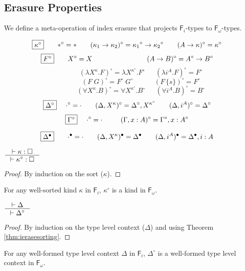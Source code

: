 \documentclass{llncs}
\newcommand{\Fi}{\ensuremath{\mathsf{F}_i}}
\newcommand{\Fw}{\ensuremath{\mathsf{F}_\omega}}
\begin{document}
\subsection{Erasure Properties} \label{ssec:erasure}

We define a meta-operation of index erasure that projects $\Fi$-types
to $\Fw$-types.

\begin{definition}\label{def:ierase}
\[ \fbox{$\kappa^\circ$}
 ~~~~ ~~
 *^\circ =
 *
 ~~~~ ~~
 (\kappa_1 -> \kappa_2)^\circ =
 {\kappa_1}^\circ -> {\kappa_2}^\circ
 ~~~~ ~~
 (A -> \kappa)^\circ =
 \kappa^\circ
\]
\[ \fbox{$F^\circ$}
 ~~~~ ~~
 X^\circ =
 X
 ~~~~ ~~~~ ~~~~ ~~~~ ~~~~ ~~~~
 (A -> B)^\circ =
 A^\circ -> B^\circ
\]
\[ \qquad \qquad
 (\lambda X^\kappa.F)^\circ =
 \lambda X^{\kappa^\circ}.F^\circ
 ~~~~ ~~~
 (\lambda i^A.F)^\circ =
 F^\circ
\]
\[ \qquad \qquad
 (F\;G)^\circ =
 F^\circ\;G^\circ
 ~~~~ ~~~~ ~~~~ ~~
 (F\,\{s\})^\circ =
 F^\circ
\]
\[ \qquad \qquad
 (\forall X^\kappa . B)^\circ =
 \forall X^{\kappa^\circ} . B^\circ
 ~~~~ ~~~
 (\forall i^A . B)^\circ =
 B^\circ
\]
\[ \fbox{$\Delta^\circ$}
 ~~~~
 \cdot^\circ = \cdot
 ~~~~ ~~
 (\Delta,X^\kappa)^\circ = \Delta^\circ,X^{\kappa^\circ}
 ~~~~ ~~
 (\Delta,i^A)^\circ = \Delta^\circ
\]
\[ \fbox{$\Gamma^\circ$}
 ~~~~
 \cdot^\circ = \cdot
 ~~~~ ~~~~
 (\Gamma,x:A)^\circ = \Gamma^\circ,x:A^\circ
\]
\end{definition}

\begin{definition}
        \[ \fbox{$\Delta^\bullet$} ~~~~ ~~ \cdot^\bullet = \cdot \qquad
        (\Delta,X^\kappa)^\bullet = \Delta^\bullet \qquad
        (\Delta,i^A)^\bullet = \Delta^\bullet,i:A
\]
\end{definition}



\begin{theorem}
\label{thm:ierasesorting}
        $\inference{|- \kappa : \square}{|- \kappa^\circ : \square}$
\end{theorem}
\begin{proof}
        By induction on the sort ($\kappa$).
\end{proof}
\begin{remark}
For any well-sorted kind $\kappa$ in \Fi,
$\kappa^\circ$ is a kind in \Fw.
\end{remark}

\begin{theorem}
\label{thm:ierasetyctx}
$ \inference{|- \Delta}{|- \Delta^\circ} $
\end{theorem}
\begin{proof}
        By induction on the type level context ($\Delta$)
        and using Theorem \ref{thm:ierasesorting}.
\end{proof}
\begin{remark}
For any well-formed type level context $\Delta$ in \Fi,
$\Delta^\circ$ is a well-formed type level context in \Fw.
\end{remark}
\end{document}
